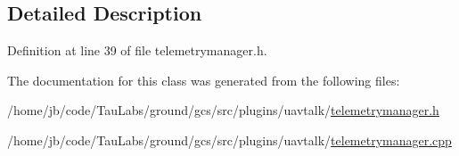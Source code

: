 \subsection{\-Detailed \-Description}


\-Definition at line 39 of file telemetrymanager.\-h.



\-The documentation for this class was generated from the following files\-:\begin{DoxyCompactItemize}
\item 
/home/jb/code/\-Tau\-Labs/ground/gcs/src/plugins/uavtalk/\hyperlink{telemetrymanager_8h}{telemetrymanager.\-h}\item 
/home/jb/code/\-Tau\-Labs/ground/gcs/src/plugins/uavtalk/\hyperlink{telemetrymanager_8cpp}{telemetrymanager.\-cpp}\end{DoxyCompactItemize}
